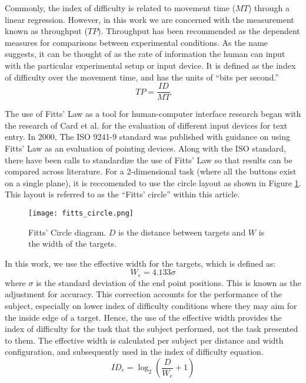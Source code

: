 Commonly, the index of difficulty is related to movement time (${MT}$) through a linear regression.
However, in this work we are concerned with the measurement known as throughput (${TP}$).
Throughput has been recommended as the dependent measures for comparisons between experimental conditions\cite{soukoreff_towards_2004}.
As the name suggests, it can be thought of as the rate of information the human can input with the particular experimental setup or input device.
It is defined as the index of difficulty over the movement time, and has the units of ``bits per second.''
\begin{equation}
    {TP}=\frac{ID}{MT}
    \label{eq:throughput}
\end{equation}

The use of Fitts' Law as a tool for human-computer interface research began with the research of Card et al.\cite{card_evaluation_1978} for the evaluation of different input devices for text entry.
In 2000, The ISO 9241-9 standard was published with guidance on using Fitts' Law as an evaluation of pointing devices\cite{international_organization_for_standardization_iso_2000}.
Along with the ISO standard, there have been calls to standardize the use of Fitts' Law so that results can be compared across literature\cite{soukoreff_towards_2004}.
For a 2-dimensional task (where all the buttons exist on a single plane), it is reccomended to use the circle layout as shown in Figure \ref{fig:ph_fitts_circle}.
This layout is referred to as the ``Fitts' circle'' within this article.

\begin{figure}
    \centering
    \texttt{[image: fitts\_circle.png]}
    \caption{Fitts' Circle diagram. $D$ is the distance between targets and $W$ is the width of the targets.}
    \label{fig:ph_fitts_circle}
\end{figure}

In this work, we use the effective width for the targets, which is defined as:
\begin{equation}
    W_e = 4.133\sigma
\end{equation}
where $\sigma$ is the standard deviation of the end point positions.
This is known as the adjustment for accuracy\cite{welford_fundamentals_1968}.
This correction accounts for the performance of the subject, especially on lower index of difficulty conditions where they may aim for the inside edge of a target.
Hence, the use of the effective width provides the index of difficulty for the task that the subject performed, not the task presented to them.
The effective width is calculated per subject per distance and width configuration, and subsequently used in the index of difficulty equation.
\begin{equation}
    {ID}_e=\log_2\left(\frac{D}{W_e}+1\right)
\end{equation}

